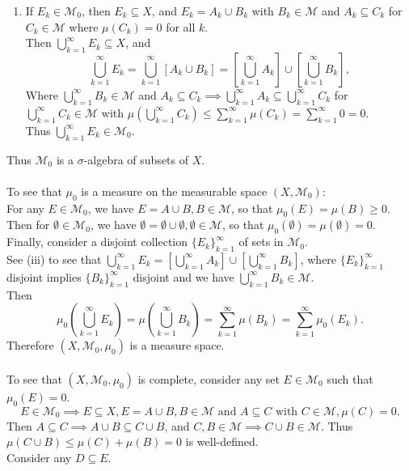 \begin{enumerate}
\begin{enumerate}[label=(\roman*),align=left]
		\item If $E_k\in\mathcal{M}_0$, then $E_k\subseteq X$, and $E_k=A_k\cup B_k$ with $B_k\in\mathcal{M}$ and $A_k\subseteq C_k$ for $C_k\in\mathcal{M}$ where $\mu(C_k)=0$ for all $k$.\\
		Then $\bigcup_{k=1}^\infty E_k\subseteq X$, and 
		\[
			\bigcup_{k=1}^\infty E_k=\bigcup_{k=1}^\infty [A_k\cup B_k]=[\bigcup_{k=1}^\infty A_k]\cup[\bigcup_{k=1}^\infty B_k],
		\]
		Where $\bigcup_{k=1}^\infty B_k\in\mathcal{M}$ and $A_k\subseteq C_k\implies\bigcup_{k=1}^\infty A_k\subseteq \bigcup_{k=1}^\infty C_k$ for $\bigcup_{k=1}^\infty C_k\in\mathcal{M}$ with $\mu(\bigcup_{k=1}^\infty C_k)\le\sum_{k=1}^\infty\mu(C_k)=\sum_{k=1}^\infty0=0$.
		\\Thus $\bigcup_{k=1}^\infty E_k\in\mathcal{M}_0$.
	\end{enumerate}
	Thus $\mathcal{M}_0$ is a $\sigma$-algebra of subsets of $X$.\\
	\\To see that $\mu_0$ is a measure on the measurable space $(X,\mathcal{M}_0)$:
	\\For any $E\in\mathcal{M}_0$, we have $E=A\cup B,B\in\mathcal{M}$, so that $\mu_0(E)=\mu(B)\ge0$.
	\\Then for $\emptyset\in\mathcal{M}_0$, we have $\emptyset=\emptyset\cup \emptyset,\emptyset\in\mathcal{M}$, so that $\mu_0(\emptyset)=\mu(\emptyset)=0$.
	\\Finally, consider a disjoint collection $\{E_k\}_{k=1}^\infty$ of sets in $\mathcal{M}_0$.
	\\See (iii) to see that $\bigcup_{k=1}^\infty E_k=[\bigcup_{k=1}^\infty A_k]\cup[\bigcup_{k=1}^\infty B_k]$, where $\{E_k\}_{k=1}^\infty$ disjoint implies $\{B_k\}_{k=1}^\infty$ disjoint and we have $\bigcup_{k=1}^\infty B_k\in\mathcal{M}$.
	\\Then 
	\[
		\mu_0(\bigcup_{k=1}^\infty E_k)=\mu(\bigcup_{k=1}^\infty B_k)=\sum_{k=1}^\infty\mu(B_k)=\sum_{k=1}^\infty\mu_0(E_k).
	\]
	Therefore $(X,\mathcal{M}_0,\mu_0)$ is a measure space.\\
	\\To see that $(X,\mathcal{M}_0,\mu_0)$ is complete, consider any set $E\in\mathcal{M}_0$ such that $\mu_0(E)=0$.
	\[
		E\in\mathcal{M}_0\implies E\subseteq X,E=A\cup B, B\in\mathcal{M}\text{ and }A\subseteq C\text{ with }C\in\mathcal{M}, \mu(C)=0.
	\]
	Then $A\subseteq C\implies A\cup B\subseteq C\cup B$, and $C,B\in\mathcal{M}\implies C\cup B\in\mathcal{M}$.
	Thus $\mu(C\cup B)\le \mu(C)+\mu(B)=0$ is well-defined.
	\\Consider any $D\subseteq E$.

\end{enumerate}
